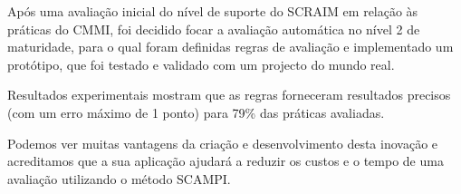 Após uma avaliação inicial do nível de suporte do SCRAIM em relação às práticas do CMMI, foi decidido focar a avaliação automática no nível 2 de maturidade, para o qual foram definidas regras de avaliação e implementado um protótipo, que foi testado e validado com um projecto do mundo real.

Resultados experimentais mostram que as regras forneceram resultados precisos (com um erro máximo de 1 ponto) para 79\% das práticas avaliadas.

Podemos ver muitas vantagens da criação e desenvolvimento desta inovação e acreditamos que a sua aplicação ajudará a reduzir os custos e o tempo de uma avaliação utilizando o método SCAMPI.
